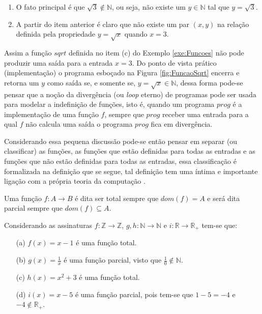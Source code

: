 \begin{enumerate}
	\item O fato principal é que $\sqrt{3} \notin \mathbb{N}$, ou seja, não existe um $y \in \mathbb{N}$ tal que $y = \sqrt{3}$.
	\item A partir do item anterior é claro que não existe um par $(x, y)$ na relação definida pela propriedade $y = \sqrt{x}$ quando $x = 3$.	
\end{enumerate}

Assim a função $sqrt$ definida no item (c) do Exemplo \ref{exe:Funcoes} não pode produzir uma saída para a entrada $x = 3$. Do ponto de vista prático (implementação) o programa esboçado na Figura \ref{fig:FuncaoSqrt} encerra e retorna um $y$ como saída se, e somente se,  $y = \sqrt{x} \in \mathbb{N}$, dessa forma pode-se pensar que a noção da divergência (ou \textit{loop} eterno) de programas pode ser usada para modelar a indefinição de funções, isto é, quando um programa $prog$ é a implementação de uma função $f$, sempre que $prog$ receber uma entrada para a qual $f$ não calcula uma saída o programa $prog$ fica em divergência.

Considerando essa pequena discussão pode-se então pensar em separar (ou classificar) as funções, as funções que estão definidas para todas as entradas e as funções que não estão definidas para todas as entradas, essa classificação é formalizada na definição que se segue, tal definição tem uma íntima e importante ligação com a própria teoria da computação \cite{benjaLivro2010, hopcroft2008}.

\begin{definicao}
	Uma função $f: A \rightarrow B$ é dita ser total sempre que $dom(f) = A$ e será dita parcial sempre que $dom(f) \subseteq A$.
\end{definicao}

\begin{exemplo}\label{exe:FuncoesTotaisParciais1}
	Considerando as assinaturas $f: \mathbb{Z} \rightarrow \mathbb{Z}$, $g, h: \mathbb{N} \rightarrow \mathbb{N}$ e $i: \mathbb{R} \rightarrow \mathbb{R}_+$ tem-se que:
	\begin{itemize}
		\item[(a)] $f(x) = x - 1$ é uma função total. 
		\item[(b)] $g(x) = \displaystyle\frac{1}{x}$ é uma função parcial, visto que $\displaystyle\frac{1}{0} \notin \mathbb{N}$.
		\item[(c)] $h(x) = x^2 + 3$ é uma função total.
		\item[(d)] $i(x) = x - 5$ é uma função parcial, pois tem-se que $1 - 5 = -4$ e $-4 \notin \mathbb{R}_+$.
	\end{itemize}
\end{exemplo}

